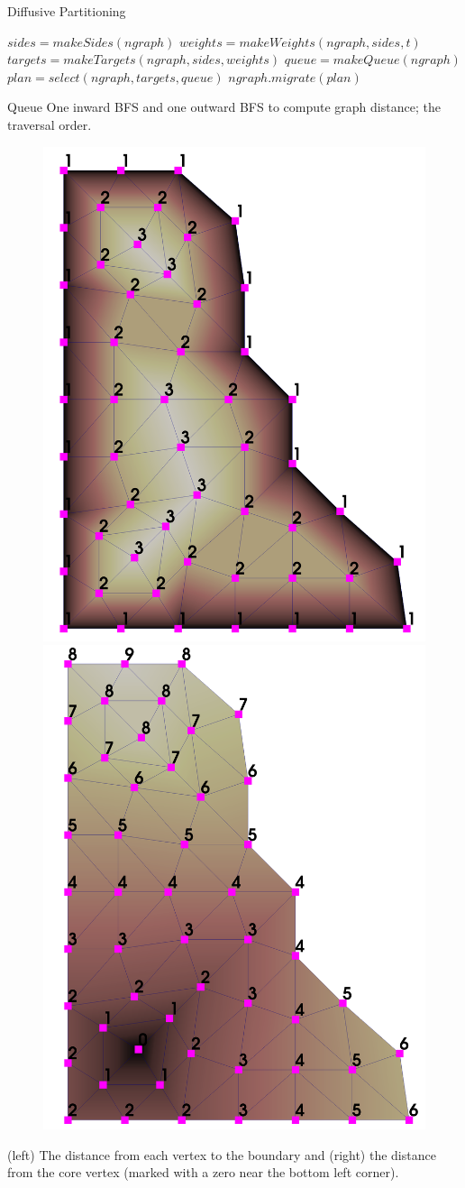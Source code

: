 \documentclass[final]{beamer}
\newlength{\onecolwid}
\begin{document}
\begin{frame}[t]
\begin{columns}[t]
\begin{column}{\onecolwid}
\begin{block}{Diffusive Partitioning}
\begin{algorithm}[H]
\begin{algorithmic}[1]
      \State $sides = makeSides(ngraph)$
      \State $weights = makeWeights(ngraph,sides,t)$
      \State $targets = makeTargets(ngraph,sides,weights)$
      \State $queue = makeQueue(ngraph)$
      \State $plan = select(ngraph,targets,queue)$
      \State $ngraph.migrate(plan)$
      \EndProcedure
    \end{algorithmic}
  \end{algorithm}
\end{block}

\begin{block}{Queue}
  One inward BFS and one outward BFS to compute graph distance; the traversal
  order.
  \begin{figure}
    \centering
    \includegraphics[width=.4\textwidth]{../accelerated_cse19/figures/2dTreeDepth.png}
    \includegraphics[width=.41\textwidth]{../accelerated_cse19/figures/2dDistance.png}
  \end{figure}
      (left) The distance from each vertex to the boundary and (right) the
    distance from the core vertex (marked with a zero near the
    bottom left corner).
\end{block}


\end{column}
\end{columns}
\end{frame}
\end{document}
